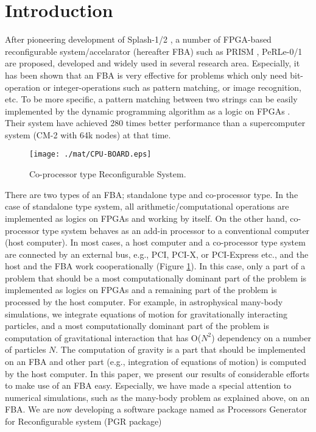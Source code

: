 \documentclass[times, 10pt,twocolumn]{article}
\begin{document}
\section{Introduction}
After pioneering development of Splash-1/2 \cite{Splash},
a number of FPGA-based reconfigurable system/accelarator (hereafter FBA)
such as PRISM \cite{W93}, PeRLe-0/1 \cite{VBRSTB94}
are proposed, developed and widely used in several research area.
Especially, it has been shown that an FBA is very effective for
problems which only need bit-operation or integer-operations
such as pattern matching, or image recognition, etc.
To be more specific, a pattern matching between two strings
can be easily implemented by the dynamic programming algorithm \cite{DP}
as a logic on FPGAs \cite{Splash}.
Their system have achieved 280 times better performance than
a supercomputer system (CM-2 with 64k nodes) at that time.

\begin{figure}[htb]
\begin{center}
\texttt{[image: ./mat/CPU-BOARD.eps]}
\caption{Co-processor type Reconfigurable System.}
\label{CPU-BOARD}
\end{center}
\end{figure}

There are two types of an FBA; standalone type and co-processor type.
In the case of standalone type system, all arithmetic/computational operations
are implemented as logics on FPGAs and working by itself.
On the other hand, co-processor type system behaves as an add-in processor 
to a conventional computer (host computer).
In most cases, a host computer and a co-processor type system 
are connected by an external bus, e.g., PCI, PCI-X, or PCI-Express etc., 
and the host and the FBA work cooperationally (Figure \ref{CPU-BOARD}).
In this case, only a part of a problem
that should be a most computationally dominant part of the problem
is implemented as logics on FPGAs and
a remaining part of the problem is processed by the host computer.
For example, in astrophysical many-body simulations, 
we integrate equations of motion for gravitationally interacting particles,
and a most computationally dominant part of the problem is 
computation of gravitational interaction that has O($N^2$) dependency
on a number of particles $N$.
The computation of gravity is a part that should be implemented on 
an FBA and other part (e.g., integration of equations of motion)
is computed by the host computer.
In this paper, we present our results of considerable efforts
to make use of an FBA easy.
Especially, we have made a special attention to numerical simulations, 
such as the many-body problem as explained above, on an FBA.
We are now developing a software package named as
Processors Generator for Reconfigurable system (PGR package)
\end{document}
